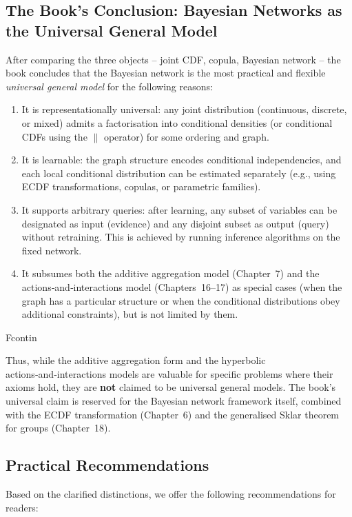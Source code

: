 \subsection{The Book’s Conclusion: Bayesian Networks as the Universal General Model}

After comparing the three objects – joint CDF, copula, Bayesian network – the book concludes that the Bayesian network is the most practical and flexible \emph{universal general model} for the following reasons:

\begin{enumerate}
    \item It is representationally universal: any joint distribution (continuous, discrete, or mixed) admits a factorisation into conditional densities (or conditional CDFs using the $\|$ operator) for some ordering and graph.
    \item It is learnable: the graph structure encodes conditional independencies, and each local conditional distribution can be estimated separately (e.g., using ECDF transformations, copulas, or parametric families).
    \item It supports arbitrary queries: after learning, any subset of variables can be designated as input (evidence) and any disjoint subset as output (query) without retraining. This is achieved by running inference algorithms on the fixed network.
    \item It subsumes both the additive aggregation model (Chapter~7) and the actions‑and‑interactions model (Chapters~16–17) as special cases (when the graph has a particular structure or when the conditional distributions obey additional constraints), but is not limited by them.
\end{enumerate}Fcontin

Thus, while the additive aggregation form and the hyperbolic actions‑and‑interactions models are valuable for specific problems where their axioms hold, they are \textbf{not} claimed to be universal general models. The book’s universal claim is reserved for the Bayesian network framework itself, combined with the ECDF transformation (Chapter~6) and the generalised Sklar theorem for groups (Chapter~18).

\subsection{Practical Recommendations}

Based on the clarified distinctions, we offer the following recommendations for readers:

